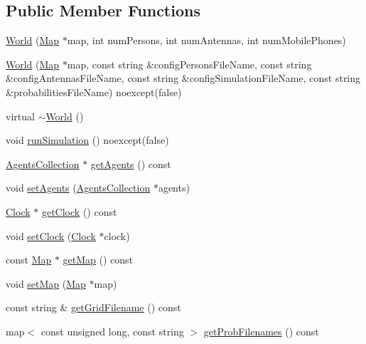 \subsection*{Public Member Functions}
\begin{DoxyCompactItemize}
\item 
\mbox{\hyperlink{class_world_a94871f094bb3eabb67f5bd1b10396832}{World}} (\mbox{\hyperlink{class_map}{Map}} $\ast$map, int num\+Persons, int num\+Antennas, int num\+Mobile\+Phones)
\item 
\mbox{\hyperlink{class_world_adeb8454b3713d9dc1d05ca1f901e7b77}{World}} (\mbox{\hyperlink{class_map}{Map}} $\ast$map, const string \&config\+Persons\+File\+Name, const string \&config\+Antennas\+File\+Name, const string \&config\+Simulation\+File\+Name, const string \&probabilities\+File\+Name) noexcept(false)
\item 
virtual \mbox{\hyperlink{class_world_a9ce9875f5e35e293661857e4a2c1d2e4}{$\sim$\+World}} ()
\item 
void \mbox{\hyperlink{class_world_aa825a43f968c8fe750c67156e64721ff}{run\+Simulation}} () noexcept(false)
\item 
\mbox{\hyperlink{class_agents_collection}{Agents\+Collection}} $\ast$ \mbox{\hyperlink{class_world_a8cf8a54ae1f3cb61efeba2b3acebb7cc}{get\+Agents}} () const
\item 
void \mbox{\hyperlink{class_world_afa8e5c2943c72aa664590abbb024896b}{set\+Agents}} (\mbox{\hyperlink{class_agents_collection}{Agents\+Collection}} $\ast$agents)
\item 
\mbox{\hyperlink{class_clock}{Clock}} $\ast$ \mbox{\hyperlink{class_world_a79423d285338cbe0ea501369e93e78b4}{get\+Clock}} () const
\item 
void \mbox{\hyperlink{class_world_a52ebe3eed240fe4dd37915a1dad02efd}{set\+Clock}} (\mbox{\hyperlink{class_clock}{Clock}} $\ast$clock)
\item 
const \mbox{\hyperlink{class_map}{Map}} $\ast$ \mbox{\hyperlink{class_world_a33b8543ee812ae4f8ff93329444da4cb}{get\+Map}} () const
\item 
void \mbox{\hyperlink{class_world_a9dc80487d5c2d1d4f2af0c1d7f015204}{set\+Map}} (\mbox{\hyperlink{class_map}{Map}} $\ast$map)
\item 
const string \& \mbox{\hyperlink{class_world_a7d07b06f9884185161c5cc34034a7212}{get\+Grid\+Filename}} () const
\item 
map$<$ const unsigned long, const string $>$ \mbox{\hyperlink{class_world_a026bdf1e190cdaf02481c548b8ca1a6f}{get\+Prob\+Filenames}} () const

\end{DoxyCompactItemize}
